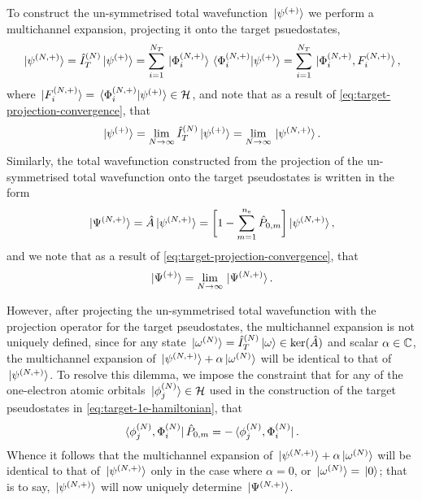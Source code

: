 \documentclass[draft]{article}
\begin{document}
To construct the un-symmetrised total wavefunction $\ket*{\psi^{(+)}}$ we
perform a multichannel expansion, projecting it onto the target psuedostates,
\begin{equation}
  \label{eq:total-wavefunction-un-symmetrised-n}
  \ket*{\psi^{\lr{N, +}}}
  =
  \hat{I}_{T}^{\lr{N}}
  \ket*{\psi^{\lr{+}}}
  =
  \sum_{i = 1}^{N_{T}}
  \ket*{\Phi_{i}^{\lr{N, +}}}
  \bra*{\Phi_{i}^{\lr{N, +}}}
  \ket*{\psi^{\lr{+}}}
  =
  \sum_{i = 1}^{N_{T}}
  \ket*{\Phi_{i}^{\lr{N, +}}, F_{i}^{\lr{N, +}}}
  ,
\end{equation}
where $\ket*{F_{i}^{(N, +)}}
= \bra*{\Phi_{i}^{(N, +)}}\ket*{\psi^{(+)}} \in \mathcal{H}$,
and note that as a result of
\autoref{eq:target-projection-convergence}, that
\begin{equation}
  \label{eq:total-wavefunction-un-symmetrised-convergence}
  \ket*{\psi^{\lr{+}}}
  =
  \lim_{N \to \infty}
  \hat{I}_{T}^{\lr{N}}
  \ket*{\psi^{\lr{+}}}
  =
  \lim_{N \to \infty}
  \ket*{\psi^{\lr{N, +}}}
  .
\end{equation}
Similarly, the total wavefunction constructed from the projection of the
un-symmetrised total wavefunction onto the target pseudostates is written in the
form
\begin{equation}
  \label{eq:total-wavefunction-antisymmetrisation-n}
  \ket*{\Psi^{\lr{N, +}}}
  =
  \hat{A}
  \ket*{\psi^{\lr{N, +}}}
  =
  \lrsq[\bigg]
  {
    1
    -
    \sum_{m = 1}^{n_{\mathrm{e}}}
    \hat{P}_{0, m}
  }
  \ket*{\psi^{\lr{N, +}}}
  ,
\end{equation}
and we note that as a result of \autoref{eq:target-projection-convergence}, that
\begin{equation}
  \label{eq:total-wavefunction-antisymmetrisation-convergence}
  \ket*{\Psi^{\lr{+}}}
  =
  \lim_{N \to \infty}
  \ket*{\Psi^{\lr{N, +}}}
  .
\end{equation}

However, after projecting the un-symmetrised total wavefunction with the
projection operator for the target pseudostates, the multichannel expansion is
not uniquely defined, since for any state
$\ket*{\omega^{(N)}} = \hat{I}_{T}^{(N)} \ket*{\omega} \in
\ker(\hat{A})$ and scalar $\alpha \in \mathbb{C}$, the multichannel
expansion of $\ket*{\psi^{(N, +)}} + \alpha \ket*{\omega^{(N)}}$ will be
identical to that of $\ket*{\psi^{(N, +)}}$.
To resolve this dilemma, we impose the constraint that for any of the
one-electron atomic orbitals
$\ket*{\phi_{j}^{(N)}} \in \mathcal{H}$ used in the
construction of the target pseudostates in \autoref{eq:target-1e-hamiltonian},
that
\begin{equation}
  \label{eq:multichannel-constraint}
  \bra*{\phi_{j}^{\lr{N}}, \Phi_{i}^{\lr{N}}}
  \hat{P}_{0, m}
  =
  -
  \bra*{\phi_{j}^{\lr{N}}, \Phi_{i}^{\lr{N}}}
  .
\end{equation}
Whence it follows that the multichannel expansion of
$\ket*{\psi^{(N, +)}} + \alpha \ket*{\omega^{(N)}}$ will be identical to
that of $\ket*{\psi^{(N, +)}}$ only in the case where $\alpha = 0$, or
$\ket*{\omega^{(N)}} = \ket*{0}$; that is to say,
$\ket*{\psi^{(N, +)}}$ will now uniquely determine $\ket*{\Psi^{(N, +)}}$.
\end{document}
